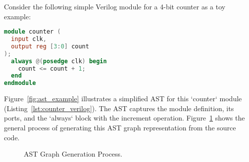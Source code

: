 \documentclass[sigplan,screen]{acmart}
\begin{document}
Consider the following simple Verilog module for a 4-bit counter as a toy example:
\begin{lstlisting}[language=Verilog, caption=A simple 4-bit counter in Verilog., label=lst:counter_verilog]
module counter (
  input clk,
  output reg [3:0] count
);
  always @(posedge clk) begin
    count <= count + 1;
  end
endmodule
\end{lstlisting}

Figure~\ref{fig:ast_example} illustrates a simplified AST for this `counter` module (Listing~\ref{lst:counter_verilog}). The AST captures the module definition, its ports, and the `always` block with the increment operation. Figure~\ref{fig:ast_process} shows the general process of generating this AST graph representation from the source code.

\begin{figure}[h]
\centering
{}
\caption{AST Graph Generation Process.}
\label{fig:ast_process}
\end{figure}
\end{document}
